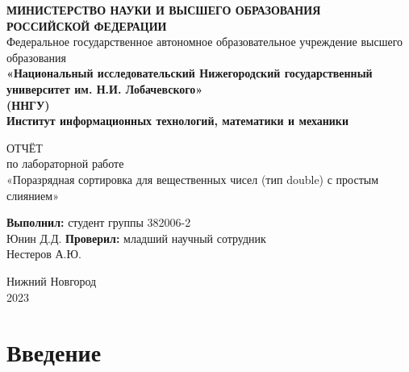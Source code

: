 \documentclass{article}
\date{}
\title{}
\author{}
\begin{document}
\begin{titlepage}
\begin{center}
    {\bfseries МИНИСТЕРСТВО НАУКИ И ВЫСШЕГО ОБРАЗОВАНИЯ \\
        РОССИЙСКОЙ ФЕДЕРАЦИИ}\\Федеральное государственное автономное образовательное учреждение высшего образования\\
    {\bfseries «Национальный исследовательский Нижегородский государственный университет им. Н.И. Лобачевского»\\(ННГУ)\\Институт информационных технологий, математики и механики} \\
\end{center}
\vspace{8em}
\begin{center}
    ОТЧЁТ\\ по лабораторной работе \\«Поразрядная сортировка для вещественных чисел (тип double) с простым слиянием»
\end{center}
\vspace{5em}
\begin{flushright}
    {\bfseries Выполнил:} студент группы 382006-2\\Юнин Д.Д.\underline{\hspace{3cm}} \linebreak\linebreak\linebreak
    {\bfseries Проверил:} младший научный сотрудник\\Нестеров А.Ю. \underline{\hspace{3cm}} 
\end{flushright}
\vspace{\fill}
\begin{center}
    Нижний Новгород\\2023
\end{center}
\end{titlepage}
\tableofcontents
\thispagestyle{empty}
\newpage

\pagestyle{plain}
\setcounter{page}{3}
\maketitle

\section{Введение}
\end{document}
